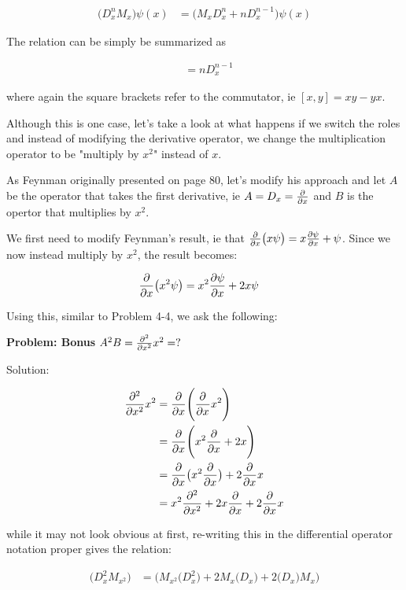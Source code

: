 \documentclass{article}
\begin{document}
\begin{align*}
        \big( D_{x}^{n} M_{x} \big) \psi (x)  &=\big( M_{x}D_{x}^{n} + nD_{x}^{n-1} \big) \psi (x)
\end{align*}

The relation can be simply be summarized as 

\begin{align*}
        [D_{x}^{n}, M_{x}]  &= nD_{x}^{n-1}
\end{align*}

where again the square brackets refer to the commutator, ie $[x,y] = xy - yx$. 

Although this is one case, let's take a look at what happens if we switch the roles and instead of modifying the derivative operator, we change the multiplication operator to be "multiply by $x^2$" instead of $x$. 

As Feynman originally presented on page 80, let's modify his approach and let $A$ be the operator that takes the first derivative, ie $A = D_{x} = \pdv{}{x}$ and $B$ is the opertor that multiplies by $x^2$. 

We first need to modify Feynman's result, ie that $\pdv{}{x} \big(x\psi\big) = x\pdv{\psi}{x} + \psi$. Since we now instead multiply by $x^2$, the result becomes: 

\begin{align*}
        \pdv{}{x} \big(x^{2}\psi\big) &= x^{2}\pdv{\psi}{x} + 2x\psi
\end{align*}

Using this, similar to Problem 4-4, we ask the following: 

\textbf{Problem: Bonus}
$A^{2}B =  \pdv[2]{}{x} x^{2} = ?$

Solution: 

\begin{align*}
     \pdv[2]{}{x}x^{2} &=\pdv{}{x} \Bigg( \pdv[]{}{x}x^{2}  \Bigg) \\
     &=\pdv{}{x} \Bigg( x^{2}\pdv{}{x} + 2x \Bigg) \\
      &=\pdv{}{x} \big( x^{2}\pdv{}{x} \big)  + 2\pdv{}{x}x\\
      &= x^{2}\pdv[2]{}{x} + 2x\pdv{}{x} + 2\pdv{}{x}x  
\end{align*}

while it may not look obvious at first, re-writing this in the differential operator notation proper gives the relation:

\begin{align*}
        \big( D_{x}^{2} M_{x^{2}} \big) &=\big( M_{x^{2}}\big( D_{x}^{2} \big) + 2M_{x}\big( D_{x} \big) + 2\big( D_{x} \big)M_{x} \big) 
\end{align*}
\end{document}
